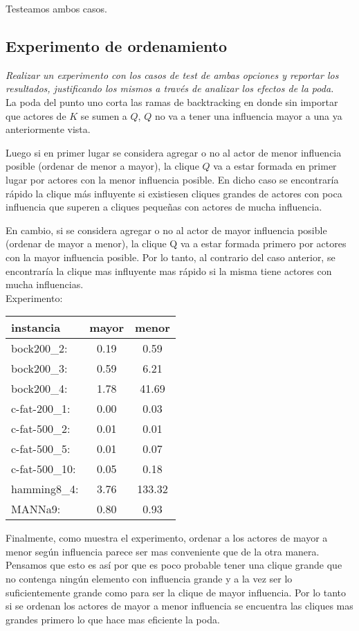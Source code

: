 \documentclass[10pt, a4paper]{article}
\begin{document}
Testeamos ambos casos.

\subsection{Experimento de ordenamiento}
\emph{Realizar un experimento con los casos de test de ambas opciones y reportar los resultados,
justificando los mismos a través de analizar los efectos de la poda.} \\

La poda del punto uno corta las ramas de backtracking en donde sin importar que actores de $K$ se sumen a $Q$, $Q$ no va a tener una influencia mayor a una ya anteriormente vista.

Luego si en primer lugar se considera agregar o no al actor de menor influencia posible (ordenar de menor a mayor), la clique $Q$ va a estar formada en primer lugar por actores con la menor influencia posible. En dicho caso se encontraría rápido la clique más influyente si existiesen cliques grandes de actores con poca influencia que superen a cliques pequeñas con actores de mucha influencia. 

En cambio, si se considera agregar o no al actor de mayor influencia posible (ordenar de mayor a menor), la clique Q va a estar formada primero por actores con la mayor influencia posible. Por lo tanto, al contrario del caso anterior, se encontraría la clique mas influyente mas rápido si la misma tiene actores con mucha influencias.
\\

Experimento:
\\
\begin{center}
\begin{tabular}{l c|c}
instancia & mayor & menor \\
\hline
bock200\_2: & 0.19 & 0.59 \\
bock200\_3: & 0.59 & 6.21 \\
bock200\_4: & 1.78 & 41.69 \\
c-fat-200\_1: & 0.00 & 0.03 \\
c-fat-500\_2: & 0.01 & 0.01 \\
c-fat-500\_5: & 0.01 & 0.07 \\
c-fat-500\_10: & 0.05 & 0.18 \\
hamming8\_4:	& 3.76 & 133.32 \\
MANNa9: & 0.80 & 0.93
\end{tabular}
\end{center}
Finalmente, como muestra el experimento, ordenar a los actores de mayor a menor según influencia parece ser mas conveniente que de la otra manera. Pensamos que esto es así por que es poco probable tener una clique grande que no contenga ningún elemento con influencia grande y a la vez ser lo suficientemente grande como para ser la clique de mayor influencia. Por lo tanto si se ordenan los actores de mayor a menor influencia se encuentra las cliques mas grandes primero lo que hace mas eficiente la poda.
\end{document}
